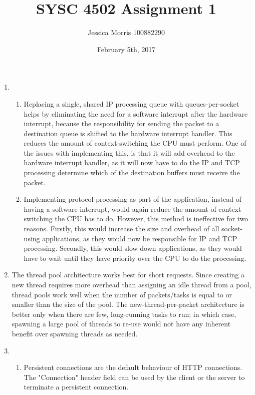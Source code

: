 \documentclass{article}
\title{SYSC 4502 Assignment 1}
\date{February 5th, 2017}
\author{Jessica Morris \(100882290\)}
\begin{document}
\maketitle

\begin{enumerate}

\item
\begin{enumerate}

\item Replacing a single, shared IP processing queue with queues-per-socket helps by eliminating the need for a software interrupt after the hardware interrupt, because the responsibility for sending the packet to a destination queue is shifted to the hardware interrupt handler. This reduces the amount of context-switching the CPU must perform. One of the issues with implementing this, is that it will add overhead to the hardware interrupt handler, as it will now have to do the IP and TCP processing determine which of the destination buffers must receive the packet.

\item  Implementing protocol processing as part of the application, instead of having a software interrupt, would again reduce the amount of context-switching the CPU has to do. However, this method is ineffective for two reasons. Firstly, this would increase the size and overhead of all socket-using applications, as they would now be responsible for IP and TCP processing. Secondly, this would slow down applications, as they would have to wait until they have priority over the CPU to do the processing.

\end{enumerate}

\item The thread pool architecture works best for short requests. Since creating a new thread requires more overhead than assigning an idle thread from a pool, thread pools work well when the number of packets/tasks is equal to or smaller than the size of the pool. The new-thread-per-packet architecture is better only when there are few, long-running tasks to run; in which case, spawning a large pool of threads to re-use would not have any inherent benefit over spawning threads as needed.

\item
\begin{enumerate}

\item Persistent connections are the default behaviour of HTTP connections. The "Connection" header field can be used by the client or the server to terminate a persistent connection.


\end{enumerate}
\end{enumerate}
\end{document}
